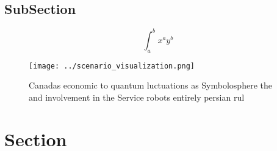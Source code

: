 \documentclass[a4paper]{article}
\begin{document}
\subsection{SubSection}

\[ \int_{a}^{b}{x^{a}y^{b}} \]

\begin{figure}
\centering
\texttt{[image: ../scenario\_visualization.png]}
\caption{Canadas economic to quantum luctuations as Symbolosphere the and involvement in the Service robots entirely persian rul
}
\end{figure}
 
\section{Section}
\end{document}
